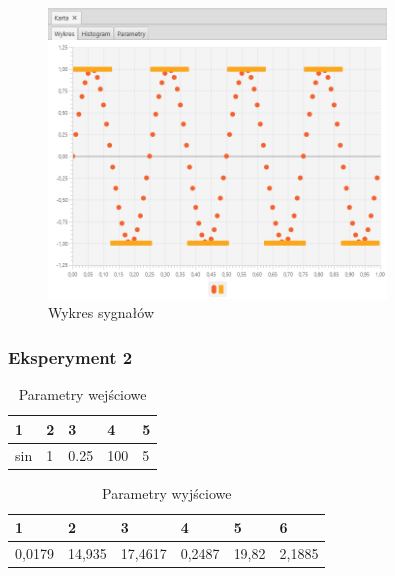 \documentclass[12pt]{article}
\begin{document}
{{{                \begin{figure}[H]
                    \centering
                    \includegraphics[width=0.8\textwidth]{img/result/experiment5/01/data_draw_sampling_output_quant_output_200408.png}
                    \caption{Wykres sygnałów}
                \end{figure}
            }
            \newpage

            \subsubsection{Eksperyment 2} {
                \begin{table}[H]
                    \centering
                    \begin{tabular}{|l|l|l|l|l|}
                        \hline
                        1 & 2 & 3 & 4 & 5   \\ \hline
                        sin & 1 & 0.25 & 100 & 5    \\ \hline
                    \end{tabular}
                    \caption{Parametry wejściowe}
                \end{table}

                \begin{table}[H]
                    \centering
                    \begin{tabular}{|l|l|l|l|l|l|}
                        \hline
                        1 & 2 & 3 & 4 & 5 & 6  \\ \hline
                        0,0179 & 14,935 & 17,4617 & 0,2487 & 19,82 & 2,1885 \\ \hline
                    \end{tabular}
                    \caption{Parametry wyjściowe}
                \end{table}


}}}
\end{document}
